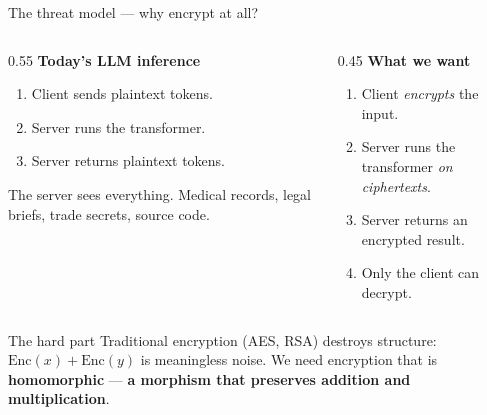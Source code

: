 \documentclass[aspectratio=169]{beamer}
\begin{document}
\begin{frame}{The threat model — why encrypt at all?}
  \begin{columns}[T]
    \begin{column}{0.55\textwidth}
      \textbf{Today's LLM inference}
      \begin{enumerate}\small
        \item Client sends plaintext tokens.
        \item Server runs the transformer.
        \item Server returns plaintext tokens.
      \end{enumerate}
      \vspace{0.3em}
      The server sees everything. Medical records, legal briefs, trade secrets,
      source code.
    \end{column}
    \begin{column}{0.45\textwidth}
      \textbf{What we want}
      \begin{enumerate}\small
        \item Client \emph{encrypts} the input.
        \item Server runs the transformer \emph{on ciphertexts}.
        \item Server returns an encrypted result.
        \item Only the client can decrypt.
      \end{enumerate}
    \end{column}
  \end{columns}
  \vspace{0.8em}
  \begin{alertblock}{The hard part}
    \footnotesize
    Traditional encryption (AES, RSA) destroys structure: $\mathrm{Enc}(x) + \mathrm{Enc}(y)$
    is meaningless noise. We need encryption that is \textbf{homomorphic}
    — \textbf{a morphism that preserves addition and multiplication}.
  \end{alertblock}
\end{frame}
\end{document}
